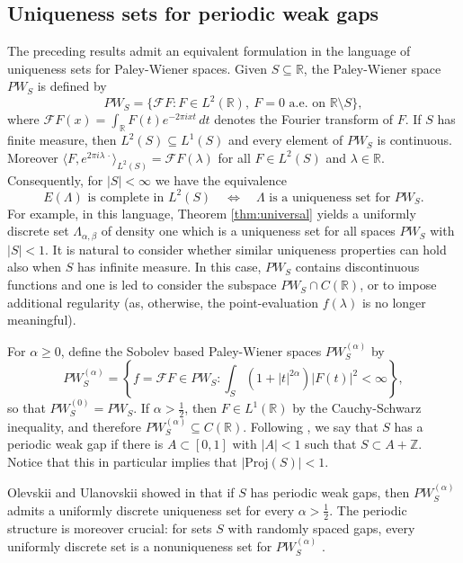 \documentclass[reqno,a4paper,12pt]{amsart}
\numberwithin{equation}{section}
\def\Z{{\mathbb Z}}
\def\R{{\mathbb R}}
\newcommand\1{\mathds{1}}
\newcommand{\ft}{{\mathcal{F}}}
\begin{document}
\subsection{Uniqueness sets for periodic weak gaps}
The preceding results admit an equivalent formulation in the language of uniqueness sets for Paley-Wiener spaces. Given $S \subseteq \R$, the Paley-Wiener space $PW_S$ is defined by
$$
PW_S = \big \{ \ft F : F \in L^2(\R), \ F = 0 \text{ a.e. on } \R \setminus S \big \},
$$
where $\ft F(x) = \int_\R F(t) e^{-2\pi i x t} \, dt$ denotes the Fourier transform of $F$.
If $S$ has finite measure, then $L^2(S) \subseteq L^1(S)$ and every element of $PW_S$ is continuous. Moreover $\langle F, e^{2\pi i \lambda \, \cdot} \rangle_{L^2(S)} = \ft F(\lambda)$ for all $F \in L^2(S)$ and $\lambda \in \R$. Consequently, for $|S| < \infty$ we have the equivalence
$$
E(\Lambda) \text{ is complete in } L^2(S) \quad \Longleftrightarrow \quad \Lambda \text{ is a uniqueness set for } PW_S.
$$
For example, in this language, Theorem \ref{thm:universal} yields a uniformly discrete set $\Lambda_{\alpha,\beta}$ of density one which is a uniqueness set for all spaces $PW_S$ with $|S| < 1$. It is natural to consider whether similar uniqueness properties can hold also when $S$ has infinite measure. In this case, $PW_S$ contains discontinuous functions and one is led to consider the subspace $PW_S \cap C(\R)$, or to impose additional regularity (as, otherwise, the point-evaluation $f(\lambda)$ is no longer meaningful).

For $\alpha \geq 0$, define the Sobolev based Paley-Wiener spaces $PW_S^{(\alpha)}$  by
$$
PW_S^{(\alpha)} = \left \{ f = \ft F \in PW_S : \int_S (1+|t|^{2\alpha}) |F(t)|^2 < \infty \right \},
$$
so that $PW^{(0)}_S = PW_S$. If $\alpha > \frac12$, then $F \in L^1(\R)$ by the Cauchy-Schwarz inequality, and therefore $PW^{(\alpha)}_S \subseteq C(\R)$.
Following \cite{OlevskiiUlanovskii2017}, we say that $S$ has a periodic weak gap if there is $A\subset [0,1]$ with $|A|<1$ such that $S\subset A+\Z$. Notice that this in particular implies that $|\mathrm{Proj}(S)| < 1$.

Olevskii and Ulanovskii showed in \cite[Theorem 3]{OlevskiiUlanovskii2017} that if $S$ has periodic weak gaps, then $PW^{(\alpha)}_S$ admits a uniformly discrete uniqueness set for every $\alpha > \frac12$. The periodic structure is moreover crucial: for sets $S$ with randomly spaced gaps, every uniformly discrete set is a nonuniqueness set for $PW^{(\alpha)}_S$ \cite[Section 6]{OlevskiiUlanovskii2017}.
\end{document}
